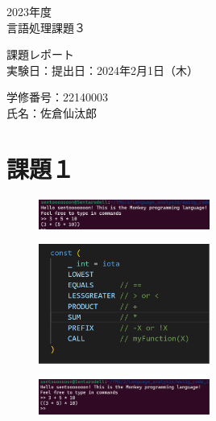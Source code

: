 \documentclass[fleqn, a4paper. 12pt]{ltjsarticle}
\begin{document}
\begin{titlepage}
      \begin{center}
      {
      \Huge 2023年度\\言語処理課題３}
      
      \vspace{4cm}
             {\Huge 課題レポート\\}
             \vspace{4cm}
                    {\large 実験日：提出日：2024年2月1日（木）\\}
                    
                    {\large 学修番号：22140003\\氏名：佐倉仙汰郎}
    \end{center}  
  \end{titlepage}

\section{課題１}
\begin{figure}[htbp]
    \centering
    \includegraphics[width=0.5\textwidth]{images/1-a.png}
    \caption{}
    \label{fig:1-a}
  \end{figure}

\begin{figure}[htbp]
    \centering
    \includegraphics[width=0.5\textwidth]{images/1-b.png}
    \caption{}
    \label{fig:1-b}
  \end{figure}

  \begin{figure}[htbp]
    \centering
    \includegraphics[width=0.5\textwidth]{images/1-c.png}
    \caption{}
    \label{fig:1-c}
  \end{figure}
\end{document}

